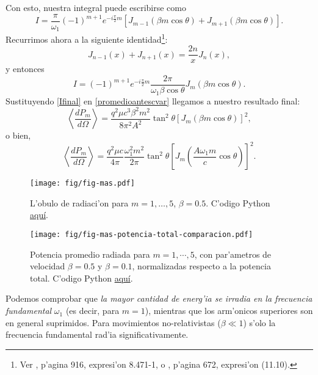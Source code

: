 Con esto, nuestra integral puede escribirse como
\begin{equation}
I=\frac{\pi}{\omega_1}(-1)^{m+1}e^{-i\frac{\pi}{2}m}\left[J_{m-1}\left(\beta
m\cos\theta\right)+J_{m+1}\left(\beta m\cos\theta\right)  \right]  .
\end{equation}
Recurrimos ahora a la siguiente identidad\footnote{Ver \cite{GR00}, p'agina 916, expresi'on 8.471-1, o \cite{AW01}, p'agina 672, expresi'on (11.10).}:
\begin{equation}
J_{n-1}(x)  +J_{n+1}(x)  =\frac{2n}{x}J_{n}\left(
x\right)  ,
\end{equation}
y entonces
\begin{equation}\label{Ifinal}
I=(-1)^{m+1}e^{-i\frac{\pi}{2}m}\frac{2\pi}{\omega_1\beta\cos\theta}J_{m}\left(  \beta m\cos\theta\right).
\end{equation}
Sustituyendo \eqref{Ifinal} en \eqref{promedioantescvar} llegamos a nuestro
resultado final:
\begin{equation}
\left\langle \frac{dP_{m}}{d\Omega}\right\rangle
=\frac{q^2\mu c^3\beta^2m^2}{8\pi^2 A^2}\tan^2\theta\left[J_{m}\left(\beta
m\cos\theta\right)\right]^2,
\end{equation}
o bien,
\begin{equation}
\boxed{\left\langle \frac{dP_{m}}{d\Omega}\right\rangle
=\frac{q^2\mu c}{4\pi}\frac{\omega_1^2m^2}{2\pi}\tan^2\theta\left[ J_{m}\left(\frac{A\omega_1
m}{c}\cos\theta\right)  \right]^2.}
\end{equation}
\begin{figure}[ht]
\centerline{\texttt{[image: fig/fig-mas.pdf]}}
\caption{L'obulo de radiaci'on para $m=1,\dots,5$, $\beta=0.5$. C'odigo Python \href{https://github.com/gfrubi/electrodinamica/blob/master/figuras-editables/fig-mas.py}{aqu\'i}.}
\label{TER2}
\end{figure}
\begin{figure}[ht]
\centerline{\texttt{[image: fig/fig-mas-potencia-total-comparacion.pdf]}}
 \caption{Potencia promedio radiada para $m=1,\cdots,5$, con par'ametros de velocidad $\beta=0.5$ y  $\beta=0.1$, normalizadas respecto a la potencia total.  C'odigo Python \href{https://github.com/gfrubi/electrodinamica/blob/master/figuras-editables/fig-mas-potencia-total-comparacion.py}{aqu\'i}.}
\label{TER3}
\end{figure}
Podemos comprobar que \textit{la mayor cantidad de energ'ia se irradia en la
frecuencia fundamental} $\omega_1$ (es decir, para $m=1$), mientras que los
arm'onicos superiores son en general suprimidos. Para movimientos
no-relativistas ($\beta\ll 1$) s'olo la frecuencia fundamental rad'ia
significativamente.

